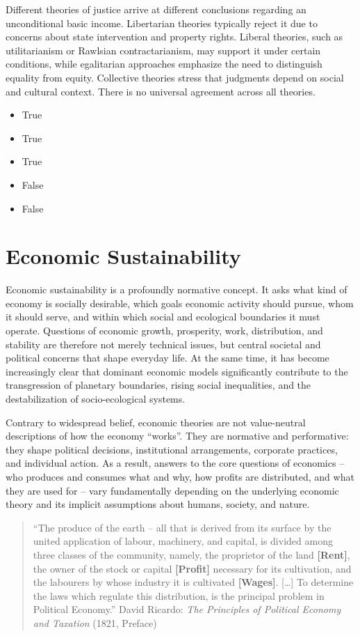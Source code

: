\documentclass[
  a4paper,
  DIV=11,
  numbers=noendperiod,
  oneside,
  openany]{scrreprt}
\providecommand{\tightlist}{%
  \setlength{\itemsep}{0pt}\setlength{\parskip}{0pt}}
\begin{document}
Different theories of justice arrive at different conclusions regarding
an unconditional basic income. Libertarian theories typically reject it
due to concerns about state intervention and property rights. Liberal
theories, such as utilitarianism or Rawlsian contractarianism, may
support it under certain conditions, while egalitarian approaches
emphasize the need to distinguish equality from equity. Collective
theories stress that judgments depend on social and cultural context.
There is no universal agreement across all theories.

\begin{itemize}
\tightlist
\item
  True
\item
  True
\item
  True
\item
  False
\item
  False
\end{itemize}

\chapter{Economic Sustainability}\label{economic-sustainability}

Economic sustainability is a profoundly normative concept. It asks what
kind of economy is socially desirable, which goals economic activity
should pursue, whom it should serve, and within which social and
ecological boundaries it must operate. Questions of economic growth,
prosperity, work, distribution, and stability are therefore not merely
technical issues, but central societal and political concerns that shape
everyday life. At the same time, it has become increasingly clear that
dominant economic models significantly contribute to the transgression
of planetary boundaries, rising social inequalities, and the
destabilization of socio-ecological systems.

Contrary to widespread belief, economic theories are not value-neutral
descriptions of how the economy ``works''. They are normative and
performative: they shape political decisions, institutional
arrangements, corporate practices, and individual action. As a result,
answers to the core questions of economics -- who produces and consumes
what and why, how profits are distributed, and what they are used for --
vary fundamentally depending on the underlying economic theory and its
implicit assumptions about humans, society, and nature.

\begin{quote}
``The produce of the earth -- all that is derived from its surface by
the united application of labour, machinery, and capital, is divided
among three classes of the community, namely, the proprietor of the land
\textbf{{[}Rent{]}}, the owner of the stock or capital
\textbf{{[}Profit{]}} necessary for its cultivation, and the labourers
by whose industry it is cultivated \textbf{{[}Wages{]}}. {[}\ldots{]} To
determine the laws which regulate this distribution, is the principal
problem in Political Economy.'' David Ricardo: \emph{The Principles of
Political Economy and Taxation} (1821, Preface)
\end{quote}
\end{document}
